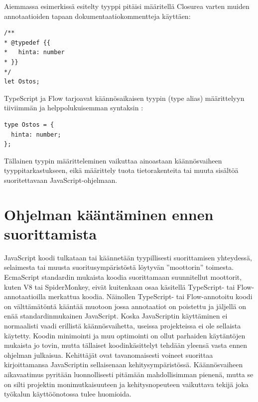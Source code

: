 \begin{minipage}{\linewidth}
Aiemmassa esimerkissä esitelty tyyppi  pitäisi
määritellä Closurea varten muiden annotaatioiden tapaan dokumentaatiokommentteja käyttäen:
\begin{lstlisting}[label={lst:closure_typedef}]
/**
* @typedef {{
*   hinta: number
* }}
*/
let Ostos;
\end{lstlisting}
\end{minipage}

TypeScript ja Flow tarjoavat käännösaikaisen tyypin (type alias)
määrittelyyn tiiviimmän ja helppolukuisemman syntaksin \cite{TypeScriptSpec}:

\begin{minipage}{\linewidth}
\begin{lstlisting}[label={lst:ts_flow_type_alias}]
type Ostos = {
  hinta: number;
};
\end{lstlisting}
\end{minipage}
Tällainen tyypin määritteleminen vaikuttaa ainoastaan käännösvaiheen
tyyppitarkastukseen, eikä määrittely tuota tietorakenteita tai muuta
sisältöä suoritettavaan JavaScript-ohjelmaan.

\section{Ohjelman kääntäminen ennen suorittamista}

JavaScript koodi tulkataan tai käännetään tyypillisesti suorittamisen
yhteydessä, selaimesta tai muusta suoritusympäristöstä löytyvän ”moottorin”
toimesta. EcmaScript standardin mukaista koodia suorittamaan suunnitellut
moottorit, kuten V8 tai SpiderMonkey, eivät kuitenkaan osaa käsitellä
TypeScript- tai Flow-annotaatioilla merkattua koodia. Näinollen TypeScript-
tai Flow-annotoitu koodi on välttämätöntä kääntää muotoon jossa
annotaatiot on poistettu ja jäljellä on enää standardinmukainen JavaScript.
Koska JavaScriptin käyttäminen ei normaalisti vaadi erillistä
käännösvaihetta, useissa projekteissa ei ole sellaista käytetty. Koodin
minimointi ja muu optimointi on ollut parhaiden käytäntöjen mukaista jo
tovin, mutta tällaiset koodinkäsittelyt tehdään yleensä vasta ennen ohjelman
julkaisua. Kehittäjät ovat tavanomaisesti voineet suorittaa kirjoittamansa
JavaScriptin sellaisenaan kehitysympäristössä. Käännösvaiheen aikavaatimus
pyritään luonnollisesti pitämään mahdollisimman pienenä, mutta se on silti
projektin monimutkaisuuteen ja kehitysnopeuteen vaikuttava tekijä joka
työkalun käyttöönotossa tulee huomioida.

